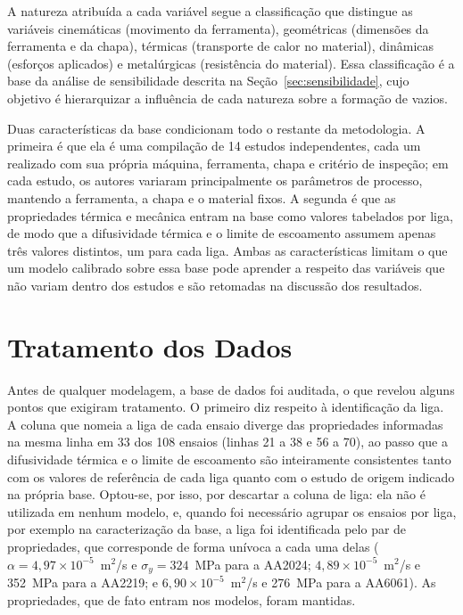 \documentclass[12pt,openany]{report}
\begin{document}
A natureza atribuída a cada variável segue a classificação que distingue as variáveis cinemáticas (movimento da ferramenta), geométricas (dimensões da ferramenta e da chapa), térmicas (transporte de calor no material), dinâmicas (esforços aplicados) e metalúrgicas (resistência do material). Essa classificação é a base da análise de sensibilidade descrita na Seção~\ref{sec:sensibilidade}, cujo objetivo é hierarquizar a influência de cada natureza sobre a formação de vazios.

Duas características da base condicionam todo o restante da metodologia. A primeira é que ela é uma compilação de 14 estudos independentes, cada um realizado com sua própria máquina, ferramenta, chapa e critério de inspeção; em cada estudo, os autores variaram principalmente os parâmetros de processo, mantendo a ferramenta, a chapa e o material fixos. A segunda é que as propriedades térmica e mecânica entram na base como valores tabelados por liga, de modo que a difusividade térmica e o limite de escoamento assumem apenas três valores distintos, um para cada liga. Ambas as características limitam o que um modelo calibrado sobre essa base pode aprender a respeito das variáveis que não variam dentro dos estudos e são retomadas na discussão dos resultados.

\section{Tratamento dos Dados}
\label{sec:tratamento}

Antes de qualquer modelagem, a base de dados foi auditada, o que revelou alguns pontos que exigiram tratamento. O primeiro diz respeito à identificação da liga. A coluna que nomeia a liga de cada ensaio diverge das propriedades informadas na mesma linha em 33 dos 108 ensaios (linhas 21 a 38 e 56 a 70), ao passo que a difusividade térmica e o limite de escoamento são inteiramente consistentes tanto com os valores de referência de cada liga quanto com o estudo de origem indicado na própria base. Optou-se, por isso, por descartar a coluna de liga: ela não é utilizada em nenhum modelo, e, quando foi necessário agrupar os ensaios por liga, por exemplo na caracterização da base, a liga foi identificada pelo par de propriedades, que corresponde de forma unívoca a cada uma delas ($\alpha = 4{,}97\times10^{-5}$~m$^2$/s e $\sigma_y = 324$~MPa para a AA2024; $4{,}89\times10^{-5}$~m$^2$/s e 352~MPa para a AA2219; e $6{,}90\times10^{-5}$~m$^2$/s e 276~MPa para a AA6061). As propriedades, que de fato entram nos modelos, foram mantidas.
\end{document}
